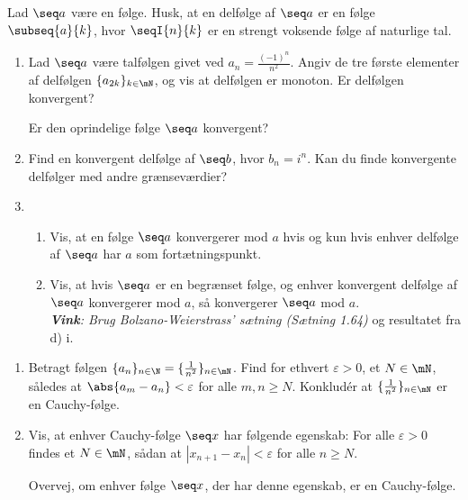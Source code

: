 \begin{opg}
Lad $\seq a$ være en følge. Husk, at en delfølge af $\seq a$ er en følge $\subseq{a}{k}$, hvor $\seqI{n}{k}$ er en strengt voksende følge af naturlige tal. 

\begin{enumerate}
    \item Lad $\seq a$ være talfølgen givet ved
    $a_n = \frac{(-1)^n}{n^2}$. 
    Angiv de tre første elementer af delfølgen $\{a_{2k}\}_{k \in \mN}$, og vis at delfølgen er monoton. Er delfølgen konvergent? 
   
    Er den oprindelige følge $\seq a$ konvergent?

    \item Find en konvergent delfølge af $\seq b$, hvor $b_n=i^n$. Kan du finde konvergente delfølger med andre grænseværdier?  
    
%    
    
    \item \begin{enumerate}[label=\roman*]
    	\item Vis, at en følge $ \seq a $ konvergerer mod $ a $ hvis og kun hvis enhver delfølge af $ \seq a $ har $ a $ som fortætningspunkt.
    	\item Vis, at hvis $ \seq a $ er en begrænset følge, og enhver konvergent delfølge af $ \seq a $ konvergerer mod $ a $, så konvergerer $ \seq a $ mod $ a $.\\
    	\emph{\textbf{Vink}: Brug Bolzano-Weierstrass' sætning (Sætning 1.64)} og resultatet fra d) i.
    \end{enumerate}
\end{enumerate}
\end{opg}

\begin{opg}\hfill
\begin{enumerate}
	\item Betragt følgen $\{a_n\}_{n\in\N}=\{\frac{1}{n^2}\}_{n\in\mN}$. Find for ethvert $\varepsilon>0$, et $N\in\mN$, således at $\abs{a_m-a_n}<\varepsilon$ for alle $m,n\geq N$. Konkludér at $ \{\frac{1}{n^2}\}_{n\in\mN} $ er en Cauchy-følge.
	
	\item Vis, at enhver Cauchy-følge $\seq x$ har følgende egenskab: For alle $\varepsilon> 0$ findes et $N \in \mN$, sådan at $|x_{n+1} - x_n|<\varepsilon$ for alle $n \geq N$.

    Overvej, om enhver følge $\seq x$, der har denne egenskab, er en Cauchy-følge.
\end{enumerate}
\end{opg}

